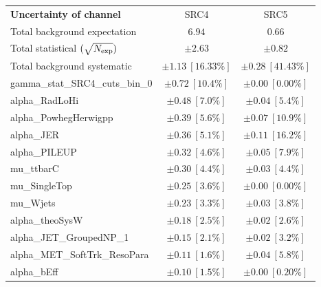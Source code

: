
\begin{table}
\begin{center}
\setlength{\tabcolsep}{0.0pc}
\begin{tabular*}{\textwidth}{@{\extracolsep{\fill}}lcc}
\noalign{\smallskip}\hline\noalign{\smallskip}
{\bf Uncertainty of channel}                                    & SRC4            & SRC5            \\
\noalign{\smallskip}\hline\noalign{\smallskip}
Total background expectation             &  $6.94$        &  $0.66$       \\
\noalign{\smallskip}\hline\noalign{\smallskip}
Total statistical $(\sqrt{N_{\rm exp}})$              & $\pm 2.63$        & $\pm 0.82$       \\
Total background systematic               & $\pm 1.13\ [16.33\%] $        & $\pm 0.28\ [41.43\%] $             \\
\noalign{\smallskip}\hline\noalign{\smallskip}
\noalign{\smallskip}\hline\noalign{\smallskip}
gamma\_stat\_SRC4\_cuts\_bin\_0         & $\pm 0.72\ [10.4\%] $          & $\pm 0.00\ [0.00\%] $       \\
alpha\_RadLoHi         & $\pm 0.48\ [7.0\%] $          & $\pm 0.04\ [5.4\%] $       \\
alpha\_PowhegHerwigpp         & $\pm 0.39\ [5.6\%] $          & $\pm 0.07\ [10.9\%] $       \\
alpha\_JER         & $\pm 0.36\ [5.1\%] $          & $\pm 0.11\ [16.2\%] $       \\
alpha\_PILEUP         & $\pm 0.32\ [4.6\%] $          & $\pm 0.05\ [7.9\%] $       \\
mu\_ttbarC         & $\pm 0.30\ [4.4\%] $          & $\pm 0.03\ [4.4\%] $       \\
mu\_SingleTop         & $\pm 0.25\ [3.6\%] $          & $\pm 0.00\ [0.00\%] $       \\
mu\_Wjets         & $\pm 0.23\ [3.3\%] $          & $\pm 0.03\ [3.8\%] $       \\
alpha\_theoSysW         & $\pm 0.18\ [2.5\%] $          & $\pm 0.02\ [2.6\%] $       \\
alpha\_JET\_GroupedNP\_1         & $\pm 0.15\ [2.1\%] $          & $\pm 0.02\ [3.2\%] $       \\
alpha\_MET\_SoftTrk\_ResoPara         & $\pm 0.11\ [1.6\%] $          & $\pm 0.04\ [5.8\%] $       \\
alpha\_bEff         & $\pm 0.10\ [1.5\%] $          & $\pm 0.00\ [0.20\%] $       \\

\end{tabular*}
\end{center}
\end{table}
